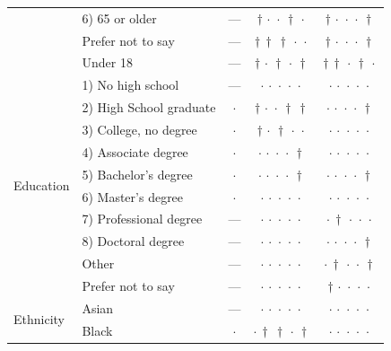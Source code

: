 {\begin{longtable}[t]{llccc}
 & 6) 65 or older & --- & ${\dagger}\,{\cdot}\,{\cdot}\,{\dagger}\,{\cdot}$ & ${\dagger}\,{\cdot}\,{\cdot}\,{\cdot}\,{\dagger}$ \\
 & Prefer not to say & --- & ${\dagger}\,{\dagger}\,{\dagger}\,{\cdot}\,{\cdot}$ & ${\dagger}\,{\cdot}\,{\cdot}\,{\cdot}\,{\dagger}$ \\
 & Under 18 & --- & ${\dagger}\,{\cdot}\,{\dagger}\,{\cdot}\,{\dagger}$ & ${\dagger}\,{\dagger}\,{\cdot}\,{\dagger}\,{\cdot}$ \\
\cline{1-5}
\multirow[t]{10}{*}{Education} & 1) No high school & --- & ${\cdot}\,{\cdot}\,{\cdot}\,{\cdot}\,{\cdot}$ & ${\cdot}\,{\cdot}\,{\cdot}\,{\cdot}\,{\cdot}$ \\
 & 2) High School graduate & $\cdot$ & ${\dagger}\,{\cdot}\,{\cdot}\,{\dagger}\,{\dagger}$ & ${\cdot}\,{\cdot}\,{\cdot}\,{\cdot}\,{\dagger}$ \\
 & 3) College, no degree & $\cdot$ & ${\dagger}\,{\cdot}\,{\dagger}\,{\cdot}\,{\cdot}$ & ${\cdot}\,{\cdot}\,{\cdot}\,{\cdot}\,{\cdot}$ \\
 & 4) Associate degree & $\cdot$ & ${\cdot}\,{\cdot}\,{\cdot}\,{\cdot}\,{\dagger}$ & ${\cdot}\,{\cdot}\,{\cdot}\,{\cdot}\,{\cdot}$ \\
 & 5) Bachelor's degree & $\cdot$ & ${\cdot}\,{\cdot}\,{\cdot}\,{\cdot}\,{\dagger}$ & ${\cdot}\,{\cdot}\,{\cdot}\,{\cdot}\,{\dagger}$ \\
 & 6) Master's degree & $\cdot$ & ${\cdot}\,{\cdot}\,{\cdot}\,{\cdot}\,{\cdot}$ & ${\cdot}\,{\cdot}\,{\cdot}\,{\cdot}\,{\cdot}$ \\
 & 7) Professional degree & --- & ${\cdot}\,{\cdot}\,{\cdot}\,{\cdot}\,{\cdot}$ & ${\cdot}\,{\dagger}\,{\cdot}\,{\cdot}\,{\cdot}$ \\
 & 8) Doctoral degree & --- & ${\cdot}\,{\cdot}\,{\cdot}\,{\cdot}\,{\cdot}$ & ${\cdot}\,{\cdot}\,{\cdot}\,{\cdot}\,{\dagger}$ \\
 & Other & --- & ${\cdot}\,{\cdot}\,{\cdot}\,{\cdot}\,{\cdot}$ & ${\cdot}\,{\dagger}\,{\cdot}\,{\cdot}\,{\dagger}$ \\
 & Prefer not to say & --- & ${\cdot}\,{\cdot}\,{\cdot}\,{\cdot}\,{\cdot}$ & ${\dagger}\,{\cdot}\,{\cdot}\,{\cdot}\,{\cdot}$ \\
\cline{1-5}
\multirow[t]{7}{*}{Ethnicity} & Asian & --- & ${\cdot}\,{\cdot}\,{\cdot}\,{\cdot}\,{\cdot}$ & ${\cdot}\,{\cdot}\,{\cdot}\,{\cdot}\,{\cdot}$ \\
 & Black & $\cdot$ & ${\cdot}\,{\dagger}\,{\dagger}\,{\cdot}\,{\dagger}$ & ${\cdot}\,{\cdot}\,{\cdot}\,{\cdot}\,{\cdot}$ \\

\end{longtable}}
